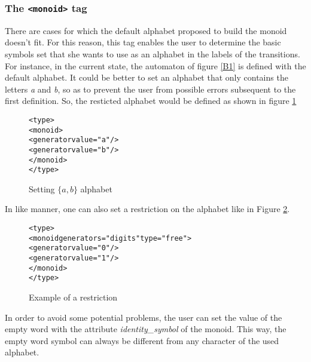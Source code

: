 \documentclass[a4paper]{llncs}
\def\monoidtag{\texttt{<monoid>}}
\begin{document}
\subsubsection{The \monoidtag{} tag}

There are cases for which the default alphabet proposed to build the
monoid doesn't fit. For this reason, this tag enables the user to
determine the basic symbols set that she wants to use as an alphabet in the
labels of the transitions.\\

For instance, in the current state, the automaton of figure \ref{B1} is
defined with the default alphabet. It could be better to set an alphabet that
only contains the letters \textit{a} and \textit{b}, so as to prevent the user
from possible errors subsequent to the first definition. So, the resticted
alphabet would be defined as shown in figure \ref{alpha1}

{\small

\begin{figure}[h]
  \begin{center}
\begin{alltt}
<type>
  <monoid>
     <generator value="a"/>
     <generator value="b"/>
  </monoid>
</type>
\end{alltt}

\caption{Setting $\{a, b\}$ alphabet}
\label{alpha1}
  \end{center}
\end{figure}
}

In like manner, one can also set a restriction on the alphabet like in Figure \ref{restriction1}.

{\small

\begin{figure}[h]
  \begin{center}
\begin{alltt}
<type>
  <monoid generators="digits" type="free">
    <generator value="0"/>
    <generator value="1"/>
  </monoid>
</type>
\end{alltt}

\caption{Example of a restriction}
\label{restriction1}
  \end{center}
\end{figure}
}

In order to avoid some potential problems, the user can set the value of the
empty word with the attribute \textit{identity\_symbol} of the monoid. This way,
the empty word symbol can always be different from any character of the used
alphabet.
\end{document}
